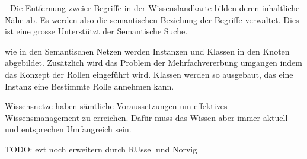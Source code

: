 - Die Entfernung zweier Begriffe in der Wissenslandkarte bilden deren inhaltliche Nähe ab. Es werden also die semantischen Beziehung der Begriffe verwaltet. Dies ist eine grosse Unterstützt der Semantische Suche.

wie in den Semantischen Netzen werden Instanzen und Klassen in den Knoten abgebildet. Zusätzlich wird das Problem der Mehrfachvererbung umgangen indem das Konzept der Rollen eingeführt wird. Klassen werden so ausgebaut, das eine Instanz eine Bestimmte Rolle annehmen kann.
	
Wissensnetze haben sämtliche Voraussetzungen um effektives Wissensmanagement zu erreichen. Dafür muss das Wissen aber immer aktuell und entsprechen Umfangreich sein.


TODO: evt noch erweitern durch RUssel und Norvig

